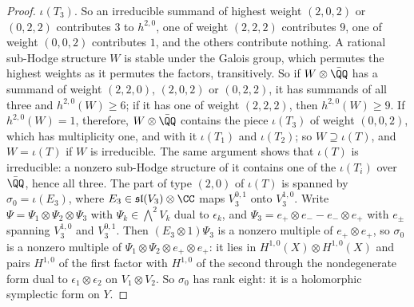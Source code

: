 \begin{proof}
$\iota(T_{3})$. So an irreducible summand of highest weight $(2,0,2)$ or
$(0,2,2)$ contributes $3$ to $h^{2,0}$, one of weight $(2,2,2)$ contributes
$9$, one of weight $(0,0,2)$ contributes $1$, and the others contribute
nothing. A rational sub-Hodge structure $W$ is stable under the Galois group,
which permutes the highest weights as it permutes the factors, transitively.
So if $W\otimes\bar{\QQ}$ has a summand of weight $(2,2,0)$, $(2,0,2)$ or
$(0,2,2)$, it has summands of all three and $h^{2,0}(W)\ge6$; if it has one of
weight $(2,2,2)$, then $h^{2,0}(W)\ge9$. If $h^{2,0}(W)=1$, therefore,
$W\otimes\bar{\QQ}$ contains the piece $\iota(T_{3})$ of weight $(0,0,2)$,
which has multiplicity one, and with it $\iota(T_{1})$ and $\iota(T_{2})$; so
$W\supseteq\iota(T)$, and $W=\iota(T)$ if $W$ is irreducible. The same
argument shows that $\iota(T)$ is irreducible: a nonzero sub-Hodge structure
of it contains one of the $\iota(T_{i})$ over $\bar{\QQ}$, hence all three.
The part of type $(2,0)$ of $\iota(T)$ is spanned by $\sigma_{0}=\iota(E_{3})$,
where $E_{3}\in\mathfrak{sl}(V_{3})\otimes\CC$ maps $V_{3}^{0,1}$ onto
$V_{3}^{1,0}$. Write $\Psi=\Psi_{1}\otimes\Psi_{2}\otimes\Psi_{3}$ with
$\Psi_{k}\in\bigwedge^{2}V_{k}$ dual to $\epsilon_{k}$, and
$\Psi_{3}=e_{+}\otimes e_{-}-e_{-}\otimes e_{+}$ with $e_{\pm}$ spanning
$V_{3}^{1,0}$ and $V_{3}^{0,1}$. Then $(E_{3}\otimes1)\Psi_{3}$ is a nonzero
multiple of $e_{+}\otimes e_{+}$, so $\sigma_{0}$ is a nonzero multiple of
$\Psi_{1}\otimes\Psi_{2}\otimes e_{+}\otimes e_{+}$: it lies in
$H^{1,0}(X)\otimes H^{1,0}(X)$ and pairs $H^{1,0}$ of the first factor with
$H^{1,0}$ of the second through the nondegenerate form dual to
$\epsilon_{1}\otimes\epsilon_{2}$ on $V_{1}\otimes V_{2}$. So $\sigma_{0}$ has
rank eight: it is a holomorphic symplectic form on $Y$.


\end{proof}
